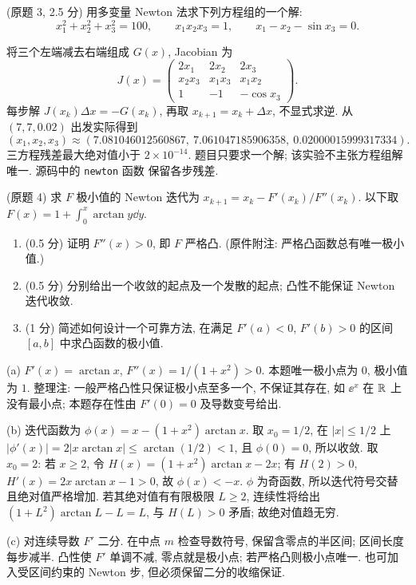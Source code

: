 \begin{exercise}\label{ps4-q3}
(原题 3, 2.5 分) 用多变量 Newton 法求下列方程组的一个解:
\[
x_1^2+x_2^2+x_3^2=100,\qquad x_1x_2x_3=1,\qquad
x_1-x_2-\sin x_3=0.
\]
\end{exercise}
\begin{solution}
将三个左端减去右端组成 $G(x)$, Jacobian 为
\[
J(x)=\begin{pmatrix}
2x_1&2x_2&2x_3\\
x_2x_3&x_1x_3&x_1x_2\\
1&-1&-\cos x_3
\end{pmatrix}.
\]
每步解 $J(x_k)\Delta x=-G(x_k)$, 再取 $x_{k+1}=x_k+\Delta x$, 不显式求逆. 从 $(7,7,0.02)$ 出发实际得到
\[
(x_1,x_2,x_3)\approx
(7.081046012560867,\ 7.061047185906358,\ 0.02000015999317334).
\]
三方程残差最大绝对值小于 $2\times10^{-14}$. 题目只要求一个解; 该实验不主张方程组解唯一. 源码中的 \texttt{newton} 函数 保留各步残差.
\end{solution}

\begin{exercise}\label{ps4-q4}
(原题 4) 求 $F$ 极小值的 Newton 迭代为
$x_{k+1}=x_k-F'(x_k)/F''(x_k)$. 以下取
$F(x)=1+\int_0^x\arctan y\dd y$.
\begin{enumerate}[label=(\alph*)]
\item (0.5 分) 证明 $F''(x)>0$, 即 $F$ 严格凸. (原件附注: 严格凸函数总有唯一极小值.)
\item (0.5 分) 分别给出一个收敛的起点及一个发散的起点; 凸性不能保证 Newton 迭代收敛.
\item (1 分) 简述如何设计一个可靠方法, 在满足 $F'(a)<0$, $F'(b)>0$ 的区间 $[a,b]$ 中求凸函数的极小值.
\end{enumerate}
\end{exercise}
\begin{solution}
(a) $F'(x)=\arctan x$, $F''(x)=1/(1+x^2)>0$. 本题唯一极小点为 $0$, 极小值为 $1$. 整理注: 一般严格凸性只保证极小点至多一个, 不保证其存在, 如 $\ee^x$ 在 $\mathbb R$ 上没有最小点; 本题存在性由 $F'(0)=0$ 及导数变号给出.

(b) 迭代函数为 $\phi(x)=x-(1+x^2)\arctan x$. 取 $x_0=1/2$, 在 $|x|\le1/2$ 上
$|\phi'(x)|=2|x\arctan x|\le\arctan(1/2)<1$, 且 $\phi(0)=0$, 所以收敛.
取 $x_0=2$: 若 $x\ge2$, 令
$H(x)=(1+x^2)\arctan x-2x$; 有 $H(2)>0$,
$H'(x)=2x\arctan x-1>0$, 故 $\phi(x)<-x$.
$\phi$ 为奇函数, 所以迭代符号交替且绝对值严格增加. 若其绝对值有有限极限 $L\ge2$, 连续性将给出
$(1+L^2)\arctan L-L=L$, 与 $H(L)>0$ 矛盾; 故绝对值趋无穷.

(c) 对连续导数 $F'$ 二分. 在中点 $m$ 检查导数符号, 保留含零点的半区间; 区间长度每步减半. 凸性使 $F'$ 单调不减, 零点就是极小点; 若严格凸则极小点唯一. 也可加入受区间约束的 Newton 步, 但必须保留二分的收缩保证.
\end{solution}

